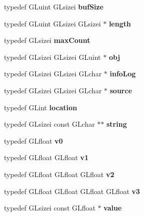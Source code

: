 \begin{DoxyCompactItemize}
\item 
typedef G\+Luint G\+Lsizei {\bfseries buf\+Size}\label{_s_d_l__opengl_8h_a09918d77dec487a91825343c8cfb2b2d}

\item 
typedef G\+Luint G\+Lsizei G\+Lsizei $\ast$ {\bfseries length}\label{_s_d_l__opengl_8h_a78c5c8710130a1a634d6a81d52be8db8}

\item 
typedef G\+Lsizei {\bfseries max\+Count}\label{_s_d_l__opengl_8h_a76b486a23d5da07752f89495cdaedcf4}

\item 
typedef G\+Lsizei G\+Lsizei G\+Luint $\ast$ {\bfseries obj}\label{_s_d_l__opengl_8h_a0c0d4701a6c89f4f7f0640715d27ab26}

\item 
typedef G\+Lsizei G\+Lsizei G\+Lchar $\ast$ {\bfseries info\+Log}\label{_s_d_l__opengl_8h_a66ecd5782c3b54799e8ac9edad536e74}

\item 
typedef G\+Lsizei G\+Lsizei G\+Lchar $\ast$ {\bfseries source}\label{_s_d_l__opengl_8h_afdd0f0e67e302eefcb4f6b23732e7ea3}

\item 
typedef G\+Lint {\bfseries location}\label{_s_d_l__opengl_8h_a6f0165ed903f22b8bb600c3e0b628e73}

\item 
typedef G\+Lsizei const G\+Lchar $\ast$$\ast$ {\bfseries string}\label{_s_d_l__opengl_8h_ae9ea2d206f76ea82db7a2ea002fdef2f}

\item 
typedef G\+Lfloat {\bfseries v0}\label{_s_d_l__opengl_8h_a8f5597b6002609ead33af221dcf29790}

\item 
typedef G\+Lfloat G\+Lfloat {\bfseries v1}\label{_s_d_l__opengl_8h_a435c176a02c061b43e19bdf7c86cceae}

\item 
typedef G\+Lfloat G\+Lfloat G\+Lfloat {\bfseries v2}\label{_s_d_l__opengl_8h_a0928f6d0f0f794ba000a21dfae422136}

\item 
typedef G\+Lfloat G\+Lfloat G\+Lfloat G\+Lfloat {\bfseries v3}\label{_s_d_l__opengl_8h_aa227f3298f83f4d646cc0fbe38dfbbed}

\item 
typedef G\+Lsizei const G\+Lfloat $\ast$ {\bfseries value}\label{_s_d_l__opengl_8h_a6a4f8a1a444e9080b297963b3db29fe0}


\end{DoxyCompactItemize}

